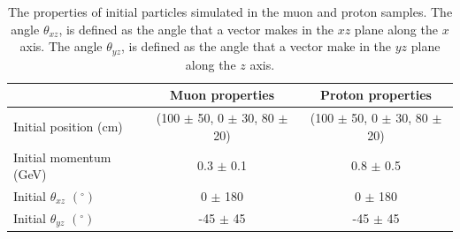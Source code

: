 \begin{table}
\caption{The properties of initial particles simulated in the muon and proton samples. The angle $\theta_{xz}$, is defined as the angle that a vector makes in the $xz$ plane along the $x$ axis. The angle $\theta_{yz}$, is defined as the angle that a vector make in the $yz$ plane along the $z$ axis.}
\centering
\label{tab:IsolProp}
\begin{tabular}{l c c}
\toprule
{} & {Muon properties} & {Proton properties} \\ 
\midrule
Initial position (cm)              & (100 $\pm$ 50, 0 $\pm$ 30, 80 $\pm$ 20) & (100 $\pm$ 50, 0 $\pm$ 30, 80 $\pm$ 20)  \\

Initial momentum (GeV)            & 0.3 $\pm$ 0.1 & 0.8 $\pm$ 0.5 \\

Initial $\theta_{xz}$ $(^{\circ})$ &   0 $\pm$ 180 &   0 $\pm$ 180 \\

Initial $\theta_{yz}$ $(^{\circ})$ & -45 $\pm$ 45  & -45 $\pm$ 45  \\
\bottomrule
\end{tabular}
\end{table}

